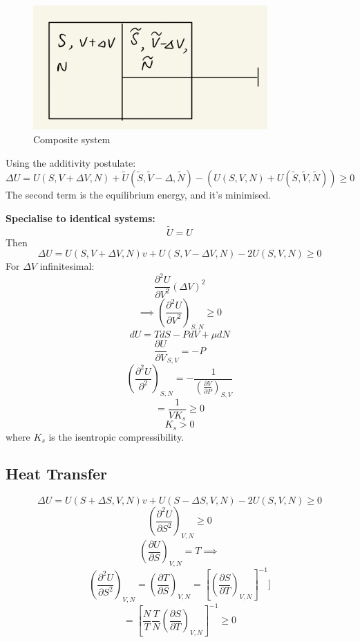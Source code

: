 \documentclass[11pt]{article}
\theoremstyle{definition}
\begin{document}
\begin{figure}[h]
	\centering
	\includegraphics[width=0.8\textwidth]{images/0702-01.png}
	\caption{Composite system}
\end{figure}

Using the additivity postulate:
\begin{equation}
	\Delta U = U(S,V + \Delta V, N) + \tilde U (\tilde S, \tilde V - \Delta , \tilde N) -  (U(S,V,N)+U(\tilde S, \tilde V, \tilde N)) \geq 0
\end{equation}
The second term is the equilibrium energy, and it's minimised.

\textbf{Specialise to identical systems:}
\[ \tilde U = U \]
Then
\[ \Delta U = U(S,V+\Delta V, N )v+ U(S,V-\Delta V,N)-2U(S,V,N) \geq 0 \] 
For $ \Delta V  $ infinitesimal:
\[ \frac{\partial ^2 U}{\partial V^2} (\Delta V)^2 \] 
\[\implies \left( \frac{\partial ^2U}{\partial V^2} \right)_{S,N} \geq 0 \]
\[ dU = TdS -PdV +\mu dN\] 
\[ \frac{\partial U}{\partial V}_{S,V} = -P \] 
\[ \left( \frac{\partial ^2U}{\partial ^2} \right)_{S,N} = - \frac{1}{ \left ( \frac{\partial V}{\partial P} \right)_{S,V} } \] 
\[ = \frac{1}{V K_s} \geq 0 \] 
\begin{equation}
	K_s > 0
\end{equation}
where $ K_s $ is the isentropic compressibility. 

\subsection{Heat Transfer}
\[ \Delta U = U(S + \Delta S,V, N )v+ U(S - \Delta S,V,N)-2U(S,V,N) \geq 0 \] 
\[ \left (\frac{\partial ^2U}{\partial S^2} \right )_{V,N} \geq 0 \] 
\[ \left (\frac{\partial U}{\partial S} \right )_{V,N} = T \implies \] 
\[ \left (\frac{\partial ^2U}{\partial S^2} \right )_{V,N} = \left (\frac{\partial T}{\partial S} \right )_{V,N} = \left[ \left (\frac{\partial S}{\partial T} \right )_{V,N} \right]^{-1} ] \] 
\[ = \left[\frac{N}{T} \frac{T}{N}\left (\frac{\partial S}{\partial T} \right )_{V,N} \right ]^{-1} \geq 0\] 
\end{document}
